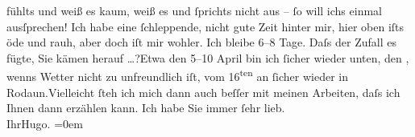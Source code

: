 \begin{ledgroupsized}[t]{13cm}
               fühlts und weiß es kaum, weiß es und ſprichts nicht aus – {\pb}ſo will ichs einmal
               ausſprechen!\pend
           \pstart
           Ich habe eine ſchleppende, nicht gute Zeit hinter mir, hier oben iſts öde und rauh,
               aber doch iſt mir wohler.\pend
           \pstart
           Ich bleibe \label{K_L02167_2v}\label{K_L02167_2h} 6–8 Tage. Daſs der Zufall es fügte, Sie kämen
               herauf {\dots}?\hspace*{1.5em}Etwa den
                  5–10 April bin ich ſicher wieder unten, den \label{K_L02167_3v}\label{K_L02167_3h}, wenns Wetter nicht zu unfreundlich iſt, vom
                     16\textsuperscript{ten} an ſicher wieder in Rodaun.\hspace*{1.5em}Vielleicht ſteh ich mich dann auch beſſer  mit meinen Arbeiten, daſs ich Ihnen dann erzählen
               kann.\pend
           \pstart
           Ich habe Sie immer ſehr lieb.{\\[\baselineskip]}Ihr\spacefill\mbox{Hugo.}\pend
           \leftskip=0em{}\endnumbering{}\end{ledgroupsized}  \newcommand{\dateiname}{L02167}\newcommand{\titel}{Hugo von Hofmannsthal an Arthur Schnitzler, 27. 3. [1914]}\newcommand{\editorInnen}{Martin Anton Müller und Gerd-Hermann Susen}
            \footnotesize
\begin{ledgroupsized}[t]{11.5cm}
\end{ledgroupsized}
         
      